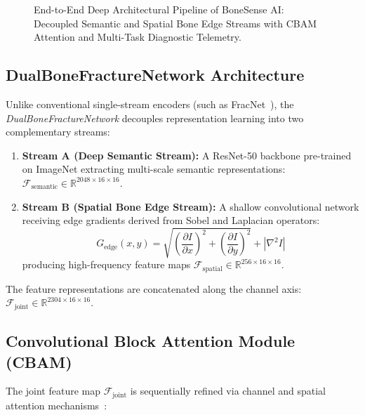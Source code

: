 \documentclass[3p,twocolumn]{elsarticle}
\begin{document}
\begin{figure}[t]
{%
}
\caption{End-to-End Deep Architectural Pipeline of BoneSense AI: Decoupled Semantic and Spatial Bone Edge Streams with CBAM Attention and Multi-Task Diagnostic Telemetry.}
\label{fig:architecture}
\end{figure}

\subsection{DualBoneFractureNetwork Architecture}
Unlike conventional single-stream encoders (such as FracNet~\cite{fracnet2025}), the \textit{DualBoneFractureNetwork} decouples representation learning into two complementary streams:
\begin{enumerate}
    \item \textbf{Stream A (Deep Semantic Stream):} A ResNet-50 backbone pre-trained on ImageNet extracting multi-scale semantic representations: $\mathcal{F}_{\text{semantic}} \in \mathbb{R}^{2048 \times 16 \times 16}$.
    \item \textbf{Stream B (Spatial Bone Edge Stream):} A shallow convolutional network receiving edge gradients derived from Sobel and Laplacian operators:
    \begin{equation}
        G_{\text{edge}}(x, y) = \sqrt{\left(\frac{\partial I}{\partial x}\right)^2 + \left(\frac{\partial I}{\partial y}\right)^2} + \left|\nabla^2 I\right|
    \end{equation}
    producing high-frequency feature maps $\mathcal{F}_{\text{spatial}} \in \mathbb{R}^{256 \times 16 \times 16}$.
\end{enumerate}
The feature representations are concatenated along the channel axis: $\mathcal{F}_{\text{joint}} \in \mathbb{R}^{2304 \times 16 \times 16}$.

\subsection{Convolutional Block Attention Module (CBAM)}
The joint feature map $\mathcal{F}_{\text{joint}}$ is sequentially refined via channel and spatial attention mechanisms~\cite{woo2018cbam}:
\end{document}

